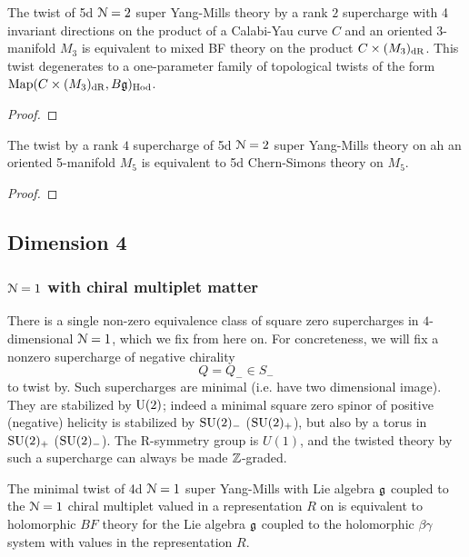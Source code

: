 \documentclass[10pt, oneside]{article}
\begin{document}
\begin{theorem} \label{5d_rk2_twist_thm}
The twist of 5d $\mathcal{N}=2$ super Yang-Mills theory by a rank $2$ supercharge with 4 invariant directions on the product of a Calabi-Yau curve $C$ and an oriented 3-manifold $M_3$ is equivalent to mixed BF theory on the product $C \times (M_3)_{\mathrm{dR}}$. This twist degenerates to a one-parameter family of topological twists of the form $\operatorname{Map}(C \times (M_3)_{\mathrm{dR}}, B\mathfrak{g})_{\mathrm{Hod}}$.
\end{theorem}

\begin{proof}
 
\end{proof}

\begin{theorem} \label{5d_rk4_twist_thm}
The twist by a rank $4$ supercharge of 5d $\mathcal{N}=2$ super Yang-Mills theory on ah an oriented 5-manifold $M_5$ is equivalent to 5d Chern-Simons theory on $M_5$.
\end{theorem}

\begin{proof}
 
\end{proof}

\subsection{Dimension 4}


\subsubsection{$\mathcal N=1$ with chiral multiplet matter}
There is a single non-zero equivalence class of square zero supercharges in $4$-dimensional $\mathcal{N} = 1$, which we fix from here on.
For concreteness, we will fix a nonzero supercharge of negative chirality $$Q = Q_- \in S_-$$ to twist by. 
Such supercharges are minimal (i.e. have two dimensional image).  
They are stabilized by ${\rm U}(2)$; indeed a minimal square zero spinor of positive (negative) helicity is stabilized by $\mathrm{SU}(2)_-$ ($\mathrm{SU}(2)_+$), but also by a torus in $\mathrm{SU}(2)_+$ ($\mathrm{SU}(2)_-$).  
The R-symmetry group is $U(1)$, and the twisted theory by such a supercharge can always be made $\mathbb Z$-graded.

\begin{prop}
The minimal twist of 4d $\mathcal N=1$ super Yang-Mills with Lie algebra $\mathfrak g$ coupled to the $\mathcal N=1$ chiral multiplet valued in a representation $R$ on  is equivalent to holomorphic $BF$ theory for the Lie algebra $\mathfrak g$ coupled to the holomorphic $\beta\gamma$ system with values in the representation $R$. 
\end{prop}
\end{document}

